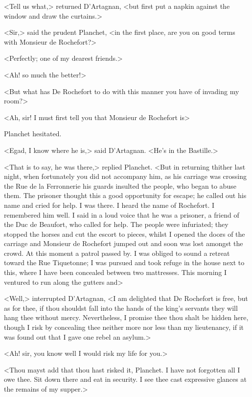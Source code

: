 <Tell us what,> returned D'Artagnan, <but first put a napkin against the window and draw the curtains.>

<Sir,> said the prudent Planchet, <in the first place, are you on good terms with Monsieur de Rochefort?>

<Perfectly; one of my dearest friends.>

<Ah! so much the better!>

<But what has De Rochefort to do with this manner you have of invading my room?>

<Ah, sir! I must first tell you that Monsieur de Rochefort is\longdash>

Planchet hesitated.

<Egad, I know where he is,> said D'Artagnan. <He's in the Bastille.>

<That is to say, he was there,> replied Planchet. <But in returning thither last night, when fortunately you did not accompany him, as his carriage was crossing the Rue de la Ferronnerie his guards insulted the people, who began to abuse them. The prisoner thought this a good opportunity for escape; he called out his name and cried for help. I was there. I heard the name of Rochefort. I remembered him well. I said in a loud voice that he was a prisoner, a friend of the Duc de Beaufort, who called for help. The people were infuriated; they stopped the horses and cut the escort to pieces, whilst I opened the doors of the carriage and Monsieur de Rochefort jumped out and soon was lost amongst the crowd. At this moment a patrol passed by. I was obliged to sound a retreat toward the Rue Tiquetonne; I was pursued and took refuge in the house next to this, where I have been concealed between two mattresses. This morning I ventured to run along the gutters and\longdash>

<Well,> interrupted D'Artagnan, <I am delighted that De Rochefort is free, but as for thee, if thou shouldst fall into the hands of the king's servants they will hang thee without mercy. Nevertheless, I promise thee thou shalt be hidden here, though I risk by concealing thee neither more nor less than my lieutenancy, if it was found out that I gave one rebel an asylum.>

<Ah! sir, you know well I would risk my life for you.>

<Thou mayst add that thou hast risked it, Planchet. I have not forgotten all I owe thee. Sit down there and eat in security. I see thee cast expressive glances at the remains of my supper.>

